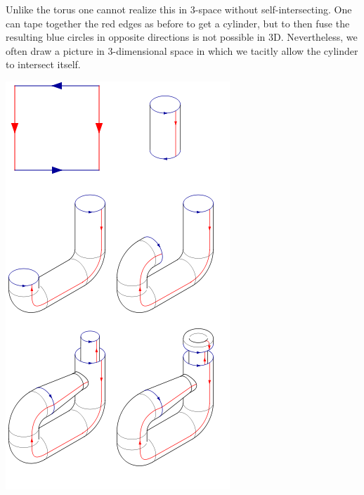 Unlike the torus one cannot realize this in $3$-space
without self-intersecting. One can tape together the red edges
as before to get a cylinder, but to then fuse the resulting blue
circles in opposite directions is not possible in 3D.
Nevertheless, we often draw a picture in 3-dimensional space
in which we tacitly allow the cylinder to intersect itself.

\begin{center}
	\begin{minipage}[c]{0.5\textwidth}
	\includegraphics[width=\textwidth]{media/klein-fold.png}

\end{minipage}
\end{center}
